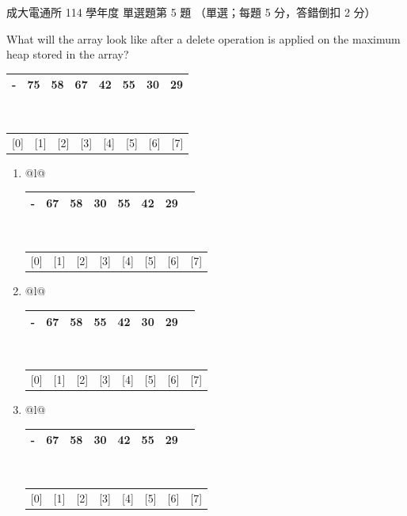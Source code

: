 \begin{pastexam}[label={px:ncku-114-cce-ds-05}]{成大電通所 114 學年度 單選題第 5 題}
（單選；每題 5 分，答錯倒扣 2 分）

What will the array look like after a delete operation is applied on the maximum heap stored in the array?
\begin{center}
\begin{tabular}{*{8}{|c}|}\hline - & 75 & 58 & 67 & 42 & 55 & 30 & 29 \\ \hline\end{tabular}\\[-2pt]
{\small\begin{tabular}{*{8}{c}}[0]&[1]&[2]&[3]&[4]&[5]&[6]&[7]\end{tabular}}
\end{center}
\begin{enumerate}[label=\alph*),itemsep=2pt]
\item \begin{tabular}[t]{@{}l@{}}\begin{tabular}{*{8}{|c}|}\hline - & 67 & 58 & 30 & 55 & 42 & 29 &  \\ \hline\end{tabular}\\[-2pt]
{\small\begin{tabular}{*{8}{c}}[0]&[1]&[2]&[3]&[4]&[5]&[6]&[7]\end{tabular}}\end{tabular}
\item \begin{tabular}[t]{@{}l@{}}\begin{tabular}{*{8}{|c}|}\hline - & 67 & 58 & 55 & 42 & 30 & 29 &  \\ \hline\end{tabular}\\[-2pt]
{\small\begin{tabular}{*{8}{c}}[0]&[1]&[2]&[3]&[4]&[5]&[6]&[7]\end{tabular}}\end{tabular}
\item \begin{tabular}[t]{@{}l@{}}\begin{tabular}{*{8}{|c}|}\hline - & 67 & 58 & 30 & 42 & 55 & 29 &  \\ \hline\end{tabular}\\[-2pt]
{\small\begin{tabular}{*{8}{c}}[0]&[1]&[2]&[3]&[4]&[5]&[6]&[7]\end{tabular}}\end{tabular}

\end{enumerate}
\end{pastexam}
